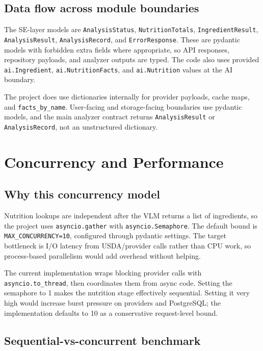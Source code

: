 \documentclass[11pt,a4paper]{article}
\begin{document}
\subsection{Data flow across module boundaries}

The SE-layer models are \texttt{AnalysisStatus}, \texttt{NutritionTotals}, \texttt{IngredientResult}, \texttt{AnalysisResult}, \texttt{AnalysisRecord}, and \texttt{ErrorResponse}. These are pydantic models with forbidden extra fields where appropriate, so API responses, repository payloads, and analyzer outputs are typed. The code also uses provided \texttt{ai.Ingredient}, \texttt{ai.NutritionFacts}, and \texttt{ai.Nutrition} values at the AI boundary.

The project does use dictionaries internally for provider payloads, cache maps, and \texttt{facts\_by\_name}. User-facing and storage-facing boundaries use pydantic models, and the main analyzer contract returns \texttt{AnalysisResult} or \texttt{AnalysisRecord}, not an unstructured dictionary.

\section{Concurrency and Performance}

\subsection{Why this concurrency model}

Nutrition lookups are independent after the VLM returns a list of ingredients, so the project uses \texttt{asyncio.gather} with \texttt{asyncio.Semaphore}. The default bound is \texttt{MAX\_CONCURRENCY=10}, configured through pydantic settings. The target bottleneck is I/O latency from USDA/provider calls rather than CPU work, so process-based parallelism would add overhead without helping.

The current implementation wraps blocking provider calls with \texttt{asyncio.to\_thread}, then coordinates them from async code. Setting the semaphore to 1 makes the nutrition stage effectively sequential. Setting it very high would increase burst pressure on providers and PostgreSQL; the implementation defaults to 10 as a conservative request-level bound.

\subsection{Sequential-vs-concurrent benchmark}
\end{document}
